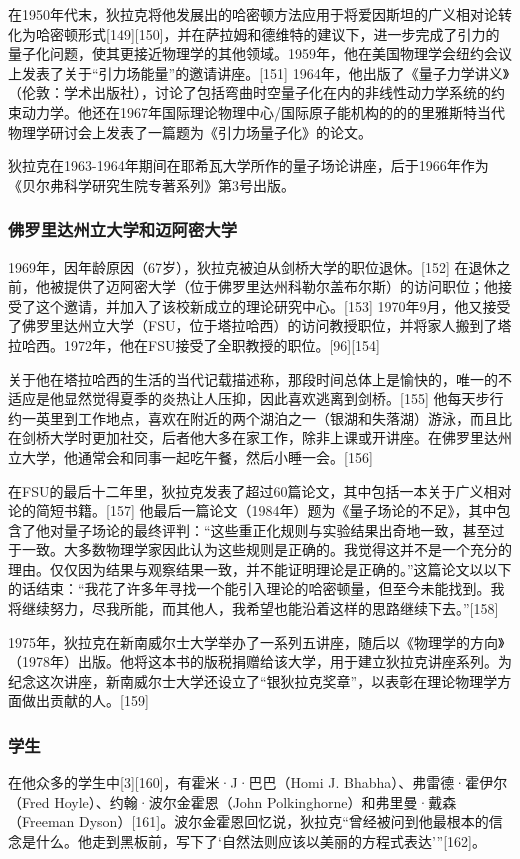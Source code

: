 在1950年代末，狄拉克将他发展出的哈密顿方法应用于将爱因斯坦的广义相对论转化为哈密顿形式[149][150]，并在萨拉姆和德维特的建议下，进一步完成了引力的量子化问题，使其更接近物理学的其他领域。1959年，他在美国物理学会纽约会议上发表了关于“引力场能量”的邀请讲座。[151] 1964年，他出版了《量子力学讲义》（伦敦：学术出版社），讨论了包括弯曲时空量子化在内的非线性动力学系统的约束动力学。他还在1967年国际理论物理中心/国际原子能机构的的的里雅斯特当代物理学研讨会上发表了一篇题为《引力场量子化》的论文。

狄拉克在1963-1964年期间在耶希瓦大学所作的量子场论讲座，后于1966年作为《贝尔弗科学研究生院专著系列》第3号出版。
\subsubsection{佛罗里达州立大学和迈阿密大学}
1969年，因年龄原因（67岁），狄拉克被迫从剑桥大学的职位退休。[152] 在退休之前，他被提供了迈阿密大学（位于佛罗里达州科勒尔盖布尔斯）的访问职位；他接受了这个邀请，并加入了该校新成立的理论研究中心。[153] 1970年9月，他又接受了佛罗里达州立大学（FSU，位于塔拉哈西）的访问教授职位，并将家人搬到了塔拉哈西。1972年，他在FSU接受了全职教授的职位。[96][154]

关于他在塔拉哈西的生活的当代记载描述称，那段时间总体上是愉快的，唯一的不适应是他显然觉得夏季的炎热让人压抑，因此喜欢逃离到剑桥。[155] 他每天步行约一英里到工作地点，喜欢在附近的两个湖泊之一（银湖和失落湖）游泳，而且比在剑桥大学时更加社交，后者他大多在家工作，除非上课或开讲座。在佛罗里达州立大学，他通常会和同事一起吃午餐，然后小睡一会。[156]

在FSU的最后十二年里，狄拉克发表了超过60篇论文，其中包括一本关于广义相对论的简短书籍。[157] 他最后一篇论文（1984年）题为《量子场论的不足》，其中包含了他对量子场论的最终评判：“这些重正化规则与实验结果出奇地一致，甚至过于一致。大多数物理学家因此认为这些规则是正确的。我觉得这并不是一个充分的理由。仅仅因为结果与观察结果一致，并不能证明理论是正确的。”这篇论文以以下的话结束：“我花了许多年寻找一个能引入理论的哈密顿量，但至今未能找到。我将继续努力，尽我所能，而其他人，我希望也能沿着这样的思路继续下去。”[158]

1975年，狄拉克在新南威尔士大学举办了一系列五讲座，随后以《物理学的方向》（1978年）出版。他将这本书的版税捐赠给该大学，用于建立狄拉克讲座系列。为纪念这次讲座，新南威尔士大学还设立了“银狄拉克奖章”，以表彰在理论物理学方面做出贡献的人。[159]
\subsubsection{学生}  
在他众多的学生中[3][160]，有霍米·J·巴巴（Homi J. Bhabha）、弗雷德·霍伊尔（Fred Hoyle）、约翰·波尔金霍恩（John Polkinghorne）和弗里曼·戴森（Freeman Dyson）[161]。波尔金霍恩回忆说，狄拉克“曾经被问到他最根本的信念是什么。他走到黑板前，写下了‘自然法则应该以美丽的方程式表达’”[162]。
